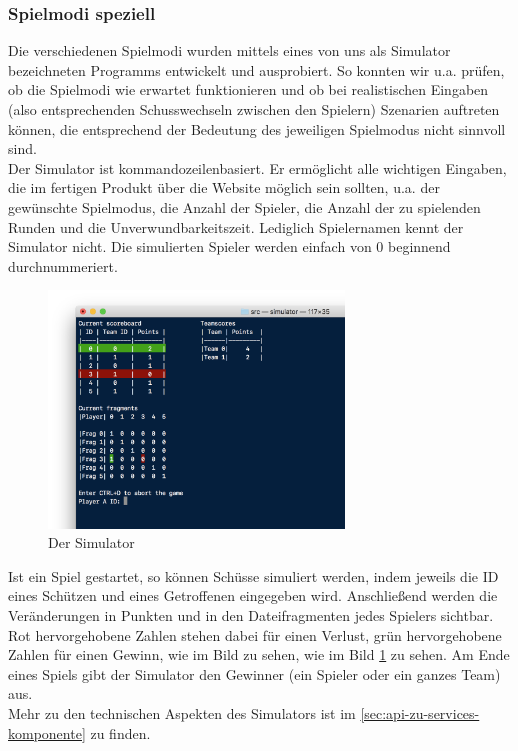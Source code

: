 \subsubsection{Spielmodi speziell}

Die verschiedenen Spielmodi wurden mittels eines von uns als Simulator bezeichneten Programms entwickelt und ausprobiert. So konnten wir u.a. prüfen, ob die Spielmodi wie erwartet funktionieren und ob bei realistischen Eingaben (also entsprechenden Schusswechseln zwischen den Spielern) Szenarien auftreten können, die entsprechend der Bedeutung des jeweiligen Spielmodus nicht sinnvoll sind. \\
Der Simulator ist kommandozeilenbasiert. Er ermöglicht alle wichtigen Eingaben, die im fertigen Produkt über die Website möglich sein sollten, u.a. der gewünschte Spielmodus, die Anzahl der Spieler, die Anzahl der zu spielenden Runden und die Unverwundbarkeitszeit. Lediglich Spielernamen kennt der Simulator nicht. Die simulierten Spieler werden einfach von 0 beginnend durchnummeriert. \\
\begin{figure}
  \centering
  \includegraphics[width=0.7\textwidth,keepaspectratio]{./040-komponenten/030-spielelogik/Simulator.png}
  \caption{Der Simulator}
  \label{fig:simulator}
\end{figure}
Ist ein Spiel gestartet, so können Schüsse simuliert werden, indem jeweils die ID eines Schützen und eines Getroffenen eingegeben wird. Anschließend werden die Veränderungen in Punkten und in den Dateifragmenten jedes Spielers sichtbar. Rot hervorgehobene Zahlen stehen dabei für einen Verlust, grün hervorgehobene Zahlen für einen Gewinn, wie im Bild zu sehen, wie im Bild \cref{fig:simulator} zu sehen.
Am Ende eines Spiels gibt der Simulator den Gewinner (ein Spieler oder ein ganzes Team) aus. \\
Mehr zu den technischen Aspekten des Simulators ist im \cref{sec:api-zu-services-komponente} zu finden.

